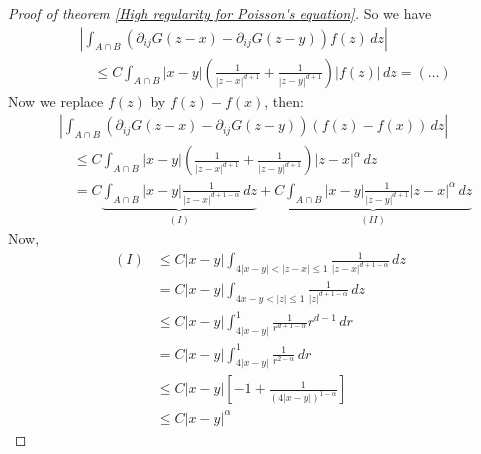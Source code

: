 \documentclass{report}
\theoremstyle{tommy}
\begin{document}
\begin{proof}[Proof of theorem \ref{High regularity for Poisson's equation}]
    So we have 
    \begin{align*}
      &\left| \int_{A \cap B} (\partial_{ij} G(z-x) - \partial_{ij} G(z-y)) f(z) \, dz \right| \\
      &\quad \le C \int_{A \cap B} |x-y| \left(\frac{1}{|z-x|^{d+1}} + \frac{1}{|z-y|^{d+1}}\right) |f(z)| \, dz = (\ldots)
    \end{align*}
    Now we replace \(f(z)\) by \(f(z) - f(x)\), then:
    \begin{align*}
      &\left| \int_{A \cap B} (\partial_{ij} G(z-x) - \partial_{ij} G(z-y)) (f(z)-f(x)) \, dz \right| \\
      &\quad \le C \int_{A \cap B} |x-y| \left(\frac{1}{|z-x|^{d+1}} + \frac{1}{|z-y|^{d+1}}\right) |z-x|^\alpha \, dz \\
      &\quad = C \underbrace{\int_{A \cap B} |x-y| \frac{1}{|z-x|^{d + 1 - \alpha}} \, dz}_{(I)} + \underbrace{C \int_{A \cap B} |x-y| \frac{1}{|z-y|^{d+1}}|z-x|^\alpha \, dz}_{(II)}
    \end{align*}
    Now, \begin{align*}
      (I) &\le C |x-y| \int_{4 |x-y| < |z-x| \le 1} \frac{1}{|z - x|^{d+1-\alpha}} \, dz \\
      &= C |x-y| \int_{4 {x-y} < |z| \le 1} \frac{1}{|z|^{d+1-\alpha}} \, dz \\
      &\le C|x-y| \int_{4|x-y|}^1 \frac{1}{r^{d+1-\alpha}}r^{d-1} \, dr \\
      &= C|x-y| \int_{4|x-y|}^1 \frac{1}{r^{2-\alpha}} \, dr \\
      &\le C |x-y| \left[-1 + \frac{1}{(4|x-y|)^{1-\alpha}}\right] \\
      &\le C|x-y|^\alpha
    \end{align*}


\end{proof}
\end{document}
